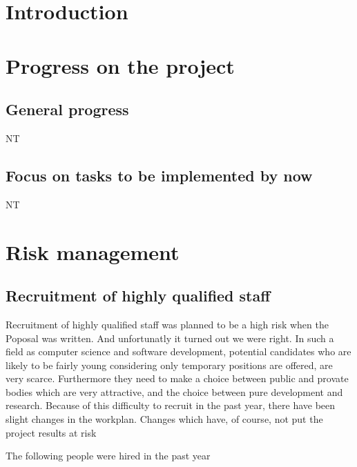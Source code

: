 \documentclass{../../Proposal/LaTeX-proposal/deliverablereport}
\author{Nicolas Thiéry \& Benoît Pilorget}
\begin{document}
\maketitle
\newpage

\tableofcontents\newpage

\section{Introduction}

\section{Progress on the project}

\subsection{General progress}

NT

\subsection{Focus on tasks to be implemented by now} 

NT

\section{Risk management}
\subsection{Recruitment of highly qualified staff}

Recruitment of highly qualified staff was planned to be a high risk when the Poposal was written. And unfortunatly it turned out we were right. In such a field as computer science and software development, potential candidates who are likely to be fairly young considering only temporary positions are offered, are very scarce. Furthermore they need to make a choice between public and provate bodies which are very attractive, and the choice between pure development and research.
Because of this difficulty to recruit in the past year, there have been slight changes in the workplan. Changes which have, of course, not put the project results at risk

The following people were hired in the past year
\end{document}
